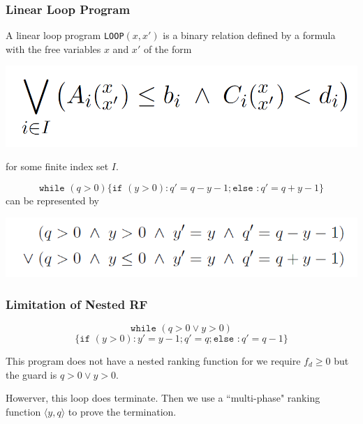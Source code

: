 \documentclass[11pt]{beamer}
\begin{document}
\begin{frame}\frametitle{Linear Loop Program}
\begin{definition}
A linear loop program \texttt{LOOP}$(x, x')$ is a binary relation defined by a formula with the free variables $x$ and $x'$ of the form
\begin{center}
\includegraphics[scale = 0.2]{15.PNG}

\end{center}
for some finite index set $I$.
\end{definition}
\begin{example}
\[\texttt{while } (q > 0)\{\texttt{if } (y > 0): q' = q - y - 1; \texttt{else }: q' = q + y - 1\}\]
can be represented by 
\begin{center}

\includegraphics[scale = 0.35]{17.PNG}
\end{center}
\end{example}
\end{frame}
\begin{frame}\frametitle{Limitation of Nested RF}
\begin{example}
\[\texttt{while }(q > 0 \vee y > 0) \]
\[\{\texttt{if }(y > 0): y' = y - 1; q ' = q;\texttt{else }: q' = q - 1\}\]
\end{example}
This program does not have a nested ranking function for we require $f_d\ge 0$ but the guard is $q > 0 \vee y > 0$.

Howerver, this loop does terminate. Then we use a ``multi-phase" ranking function $\langle y,  q\rangle$ to prove the termination.
\end{frame}
\end{document}
